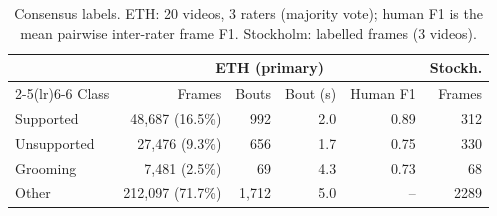 \begin{table}[t]\centering\caption{Consensus labels. ETH: 20 videos, 3 raters (majority vote); human F1 is the mean pairwise inter-rater frame F1. Stockholm: labelled frames (3 videos).}\label{tab:data}
\setlength{\tabcolsep}{3pt}\footnotesize
\begin{tabular}{lrrrrr}\toprule
& \multicolumn{4}{c}{ETH (primary)} & Stockh.\\\cmidrule(lr){2-5}\cmidrule(lr){6-6}
Class & Frames & Bouts & Bout (s) & Human F1 & Frames\\\midrule
Supported & 48{,}687 (16.5\%) & 992 & 2.0 & 0.89 & 312 \\
Unsupported & 27{,}476 (9.3\%) & 656 & 1.7 & 0.75 & 330 \\
Grooming & 7{,}481 (2.5\%) & 69 & 4.3 & 0.73 & 68 \\
Other & 212{,}097 (71.7\%) & 1{,}712 & 5.0 & -- & 2289 \\
\bottomrule\end{tabular}\end{table}
